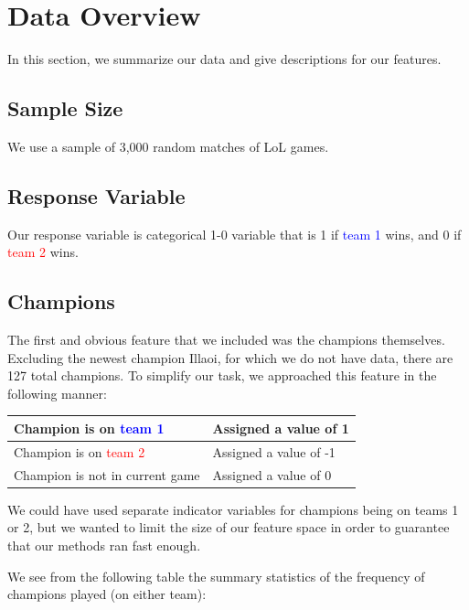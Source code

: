 \documentclass[runningheads]{llncs}
\begin{document}
	\section{Data Overview}
	
	In this section, we summarize our data and give descriptions for our features.
	
	\subsection{Sample Size}
	
	We use a sample of 3,000 random matches of LoL games.
	
	\subsection{Response Variable}
	
	Our response variable is categorical 1-0 variable that is 1 if \textcolor{blue}{team 1} wins, and 0 if \textcolor{red}{team 2} wins.
	
	\subsection{Champions}
	
	The first and obvious feature that we included was the champions themselves. Excluding the newest champion Illaoi, for which we do not have data, there are 127 total champions. To simplify our task, we approached this feature in the following manner:

	\begin{center}
		\begin{tabular}{ |l|l| }
			\hline
			Champion is on \textcolor{blue}{team 1} & Assigned a value of 1 \\ \hline
			Champion is on \textcolor{red}{team 2} & Assigned a value of -1 \\ \hline
			Champion is not in current game & Assigned a value of 0 \\ \hline
		\end{tabular}
	\end{center}
	
	We could have used separate indicator variables for champions being on teams 1 or 2, but we wanted to limit the size of our feature space in order to guarantee that our methods ran fast enough.
	
	We see from the following table the summary statistics of the frequency of champions played (on either team):
	
\end{document}
